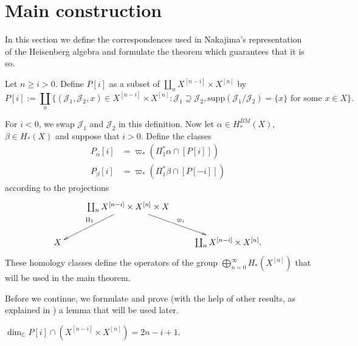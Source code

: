 \section{Main construction}
\label{section-main-construction}

\noindent
In this section we define the
correspondences used in Nakajima's representation
of the Heisenberg algebra and formulate
the theorem which guarantees that it is so.

Let $n\geq i>0$. Define $P[i]$
as a subset of
$\coprod_nX^{[n-i]}\times X^{[n]}$
by
$$
P[i]:=\coprod_n \{(\mathcal{J}_1,\mathcal{J}_2,x)
\in X^{[n-i]}\times X^{[n]}:
\mathcal{J}_1 \supseteq \mathcal{J}_2,
\text{supp}(\mathcal{J}_1/\mathcal{J}_2)=\{x\}
\text{ for some }x \in X\}.
$$

\noindent
For $i<0$, we swap $\mathcal{J}_1$ and $\mathcal{J}_2$ 
in this definition.
Now let
$\alpha \in H_*^{BM}(X)$, $\beta \in H_*(X)$
and suppose that $i>0$. Define the classes
\begin{equation}
\label{equation-correspondence-p}
\begin{aligned}
P_\alpha[i]&=\varpi_*(\Pi_1^*\alpha \cap [P[i]])\\
P_\beta[i]&=\varpi_*(\Pi_1^*\beta \cap [P[-i]])
\end{aligned}
\end{equation}
according to the projections
$$
\xymatrix{
&  \coprod_n X^{[n-i]}\times X^{[n]}\times X
\ar[dl]_{\Pi_1}\ar[dr]^{\varpi_i}\\
X&&\coprod_n X^{[n-i]}\times X^{[n]}.
}
$$
These homology classes define the operators
of the group
$\bigoplus_{n=0}^{\infty}H_*(X^{[n]})$
that will be used in the main theorem.

\medskip\noindent
Before we continue, we formulate and
prove (with the help of other results,
as explained in \cite[Section 8.3]{Nakajima-lectures})
a lemma that will be used later.

\begin{lemma}
\label{lemma-dimension}
$\dim_\mathbb{C}P[i]\cap (X^{[n-i]}\times X^{[n]})=2n-i+1$.
\end{lemma}

